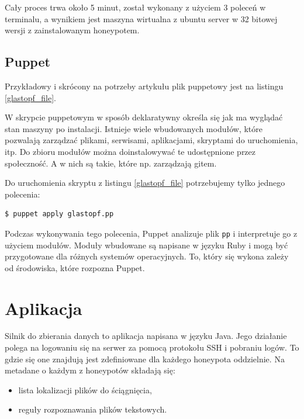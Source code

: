 \documentclass[runningheads,a4paper]{llncs}
\begin{document}
Cały proces trwa około 5 minut, został wykonany z użyciem 3 poleceń w terminalu, a wynikiem jest maszyna wirtualna z ubuntu server w 32 bitowej wersji z zainstalowanym honeypotem.

\subsection*{Puppet}

Przykładowy i skrócony na potrzeby artykułu plik puppetowy jest na listingu \ref{glastopf_file}.

\begin{glastopf_listing}[h]

\end{glastopf_listing}

W skrypcie puppetowym w sposób deklaratywny określa się jak ma wyglądać stan maszyny po instalacji. Istnieje wiele wbudowanych modułów, które pozwalają zarządzać plikami, serwisami, aplikacjami, skryptami do uruchomienia, itp. Do zbioru modułów można doinstalowywać te udostępnione przez społeczność. A w nich są takie, które np. zarządzają gitem.

Do uruchomienia skryptu z listingu \ref{glastopf_file} potrzebujemy tylko jednego polecenia:
\begin{lstlisting}
$ puppet apply glastopf.pp
\end{lstlisting}
Podczas wykonywania tego polecenia, Puppet analizuje plik \texttt{pp} i interpretuje go z użyciem modułów. Moduły wbudowane są napisane w języku Ruby i mogą być przygotowane dla różnych systemów operacyjnych. To, który się wykona zależy od środowiska, które rozpozna Puppet.

\section{Aplikacja}

Silnik do zbierania danych to aplikacja napisana w języku Java. Jego działanie polega na logowaniu się na serwer za pomocą protokołu SSH i pobraniu logów. To gdzie się one znajdują jest zdefiniowane dla każdego honeypota oddzielnie. Na metadane o każdym z honeypotów składają się:
\begin{itemize}
\item lista lokalizacji plików do ściągnięcia,
\item reguły rozpoznawania plików tekstowych.
\end{itemize}
\end{document}
